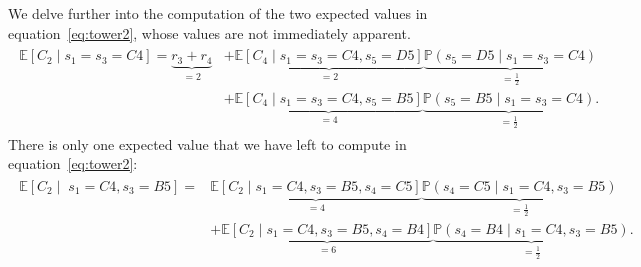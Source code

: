 \noindent We delve further into the computation of the two expected values in
equation~\eqref{eq:tower2}, whose values are not immediately apparent.
%
\begin{align*}
    \begin{split}
    \mathbb{E}[C_2 \mid s_1=s_3=C4] = \underbrace{r_3+r_4}_{=2}
    &+ \underbrace{\mathbb{E}[C_4 \mid s_1=s_3=C4, s_5=D5]}_{=2} \underbrace{\mathbb{P}(s_5=D5 \mid s_1=s_3=C4)}_{=\frac{1}{2}} \\
    &+ \underbrace{\mathbb{E}[C_4 \mid s_1=s_3=C4, s_5=B5]}_{=4} \underbrace{\mathbb{P}(s_5=B5 \mid s_1=s_3=C4)}_{=\frac{1}{2}}.
    \end{split}
\end{align*}
%
%
There is only one expected value that we have left to compute in
equation~\eqref{eq:tower2}:
%
\begin{align*}
    \begin{split}
    \mathbb{E}[C_2 \mid \; s_1=C4, s_3=B5] =
    &\underbrace{\mathbb{E}[C_2 \mid s_1=C4, s_3=B5, s_4=C5]}_{=4} \underbrace{\mathbb{P}(s_4=C5 \mid s_1=C4, s_3=B5)}_{=\frac{1}{2}} \\
    &+ \underbrace{\mathbb{E}[C_2 \mid s_1=C4, s_3=B5, s_4=B4]}_{=6} \underbrace{\mathbb{P}(s_4=B4 \mid s_1=C4, s_3=B5)}_{=\frac{1}{2}}.
    \end{split}
\end{align*}
